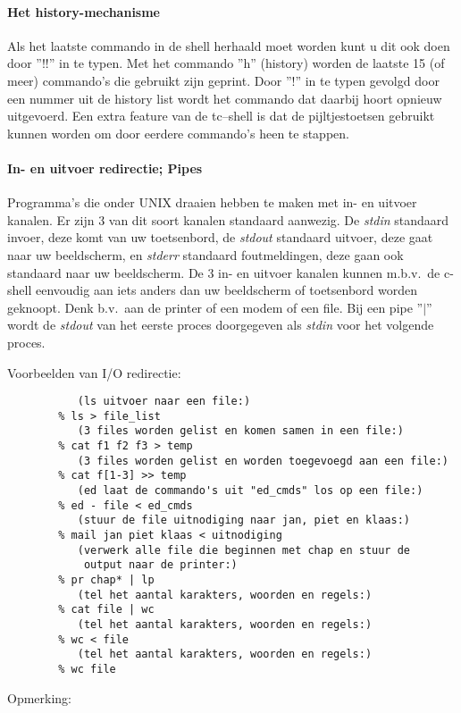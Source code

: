 \paragraph{Het history-mechanisme}
\label{Het history mechanisme}
Als het laatste commando in de shell herhaald moet worden kunt u dit
ook doen door ''!!'' in te typen. Met het commando ''h'' (history)
worden de laatste 15 (of meer) commando's die gebruikt zijn geprint.
Door ''!'' in te typen gevolgd door een nummer uit de history list
wordt het commando dat daarbij hoort opnieuw uitgevoerd.
Een extra feature van de tc--shell is dat de pijltjestoetsen gebruikt kunnen worden om
door eerdere commando's heen te stappen.
\paragraph{In- en uitvoer redirectie; Pipes}
\label{In- en uitvoer redirectie; Pipes}
Programma's die onder UNIX draaien hebben te maken met in- en uitvoer
kanalen. Er zijn 3 van dit soort kanalen standaard aanwezig.
De {\em stdin} standaard invoer, deze komt van uw toetsenbord,
de {\em stdout} standaard uitvoer, deze gaat naar uw beeldscherm,
en {\em stderr} standaard foutmeldingen, deze gaan ook standaard naar
uw beeldscherm.
De 3 in- en uitvoer kanalen kunnen m.b.v.\ de c-shell eenvoudig aan
iets anders dan uw beeldscherm of toetsenbord worden geknoopt.
Denk b.v.\ aan de printer of een modem of een file.
Bij een pipe ''{\tt $|$}'' wordt de {\em stdout} van het eerste proces
doorgegeven als {\em stdin} voor het volgende proces.

Voorbeelden van I/O redirectie:
\begin{verbatim}
           (ls uitvoer naar een file:)
        % ls > file_list
           (3 files worden gelist en komen samen in een file:)
        % cat f1 f2 f3 > temp
           (3 files worden gelist en worden toegevoegd aan een file:)
        % cat f[1-3] >> temp
           (ed laat de commando's uit "ed_cmds" los op een file:)
        % ed - file < ed_cmds
           (stuur de file uitnodiging naar jan, piet en klaas:)
        % mail jan piet klaas < uitnodiging
           (verwerk alle file die beginnen met chap en stuur de
            output naar de printer:)
        % pr chap* | lp
           (tel het aantal karakters, woorden en regels:)
        % cat file | wc
           (tel het aantal karakters, woorden en regels:)
        % wc < file
           (tel het aantal karakters, woorden en regels:)
        % wc file
\end{verbatim}
 
Opmerking:

